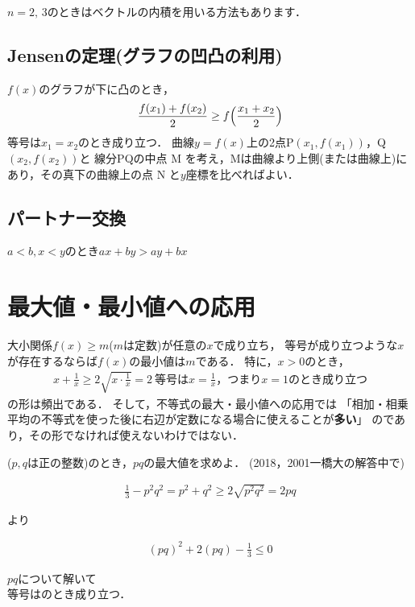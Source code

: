 \documentclass[twocolumn]{ltjsarticle}
\begin{document}
$n=2,\, 3$のときはベクトルの内積を用いる方法もあります．

\subsection{Jensenの定理(グラフの凹凸の利用)}
$f(x)$のグラフが下に凸のとき，
\begin{align*}
  \frac{f(x_{1})+f(x_{2})}{2}\geq f\Bigl(\frac{x_{1}+x_{2}}{2}\Bigr)
\end{align*}
等号は$x_{1} = x_{2}$のとき成り立つ．
曲線$y=f(x)$上の2点P$(x_{1},f(x_{1}))$，Q$(x_{2},f(x_{2}))$と
線分PQの中点
M
を考え，Mは曲線より上側(または曲線上)にあり，その真下の曲線上の点
N
と$y$座標を比べればよい．

\subsection{パートナー交換}
$a<b,x<y$のとき$ax+by>ay+bx$

\section{最大値・最小値への応用}\label{sec:apply-to-max-min}
大小関係$f(x)\geq m$($m$は定数)が任意の$x$で成り立ち，
等号が成り立つような$x$が存在するならば$f(x)$の最小値は$m$である．
特に，$x>0$のとき，
\begin{gather*}
  x+\frac{1}{x}\geq 2\sqrt{x\cdot\frac{1}{x}}=2
  \: \text{等号は$x=\frac{1}{x}$，つまり$x=1$のとき成り立つ}
\end{gather*}
の形は頻出である．
そして，不等式の最大・最小値への応用では
「相加・相乗平均の不等式を使った後に右辺が定数になる場合に使えることが\textbf{多い}」
のであり，その形でなければ使えないわけではない．\\
\begin{rei*}
   \: ($p,q$は正の整数)のとき，$pq$の最大値を求めよ．
  (2018，2001\quad 一橋大の解答中で)
  \begin{kai*}
    \begin{fleqn}[20pt]
      \begin{align*}
        \frac{1}{3}-p^2q^2=p^2+q^2\geq 2\sqrt{p^2q^2}=2pq
      \end{align*}
    \end{fleqn}
    より
    \begin{fleqn}[20pt]
      \begin{align*}
        (pq)^2 + 2(pq) - \frac{1}{3} \leq 0
      \end{align*}
    \end{fleqn}
    $pq$について解いて \\
    等号はのとき成り立つ．
  \end{kai*}
\end{rei*}
\end{document}
